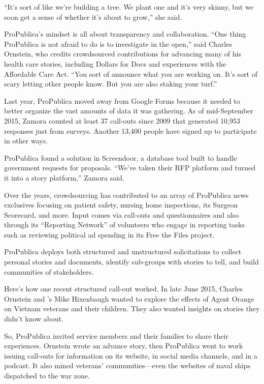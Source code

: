 \begin{itemize}
\begin{itemize}
\begin{enumerate}
{``It’s sort of like we’re building a tree. We plant one and it’s very skinny, but we soon get a sense of whether it’s about to grow,'' she said.\autocite{Zamora}

ProPublica’s mindset is all about transparency and collaboration. ``One thing ProPublica is not afraid to do is to investigate in the open,'' said Charles Ornstein, who credits crowdsourced contributions for advancing many of his health care stories, including Dollars for Docs and experiences with the Affordable Care Act. ``You sort of announce what you are working on. It’s sort of scary letting other people know. But you are also staking your turf.''\autocite{Ornstein}

Last year, ProPublica moved away from Google Forms because it needed to better organize the vast amounts of data it was gathering. As of mid-September 2015, Zamora counted at least 37 call-outs since 2009 that generated 10,953 responses just from surveys. Another 13,400 people have signed up to participate in other ways.

ProPublica found a solution in Screendoor, a database tool built to handle government requests for proposals. ``We’ve taken their RFP platform and turned it into a story platform,'' Zamora said.

Over the years, crowdsourcing has contributed to an array of ProPublica news exclusives focusing on patient safety, nursing home inspections, its Surgeon Scorecard, and more. Input comes via call-outs and questionnaires and also through its ``Reporting Network'' of volunteers who engage in reporting tasks such as reviewing political ad spending in its Free the Files project.\autocite{Files}

ProPublica deploys both structured and unstructured solicitations to collect personal stories and documents, identify sub-groups with stories to tell, and build communities of stakeholders.  

Here’s how one recent structured call-out worked. In late June 2015, Charles Ornstein and ’s Mike Hixenbaugh wanted to explore the effects of Agent Orange on Vietnam veterans and their children. They also wanted insights on stories they didn’t know about.

So, ProPublica invited service members and their families to share their experiences. Ornstein wrote an advance story, then ProPublica went to work issuing call-outs for information on its website, in social media channels, and in a podcast. It also mined veterans’ communities---even the websites of naval ships dispatched to the war zone. 

}
\end{enumerate}
\end{itemize}
\end{itemize}
